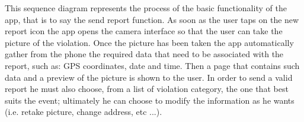 
This sequence diagram represents the process of the basic functionality of the app, that is to say the send report function. As soon as the user taps on the new report icon the app opens the camera interface so that the user can take the picture of the violation. Once the picture has been taken the app automatically gather from the phone the required data that need to be associated with the report, such as: GPS coordinates, date and time. Then a page that contains such data and a preview of the picture is shown to the user. In order to send a valid report he must also choose,     from a list of violation category, the one that best suits the event; ultimately he can choose to modify the information as he wants (i.e. retake picture, change address, etc ...). 
 